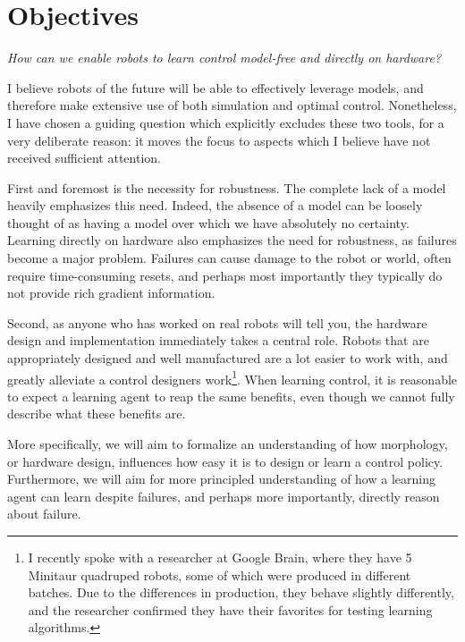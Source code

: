 \section{Objectives}
\emph{How can we enable robots to learn control model-free and directly on hardware?} \par
I believe robots of the future will be able to effectively leverage models, and therefore make extensive use of both simulation and optimal control.
Nonetheless, I have chosen a guiding question which explicitly excludes these two tools, for a very deliberate reason: it moves the focus to aspects which I believe have not received sufficient attention. \par
First and foremost is the necessity for robustness. The complete lack of a model heavily emphasizes this need. Indeed, the absence of a model can be loosely thought of as having a model over which we have absolutely no certainty.
Learning directly on hardware also emphasizes the need for robustness, as failures become a major problem. Failures can cause damage to the robot or world, often require time-consuming resets, and perhaps most importantly they typically do not provide rich gradient information. \par
Second, as anyone who has worked on real robots will tell you, the hardware design and implementation immediately takes a central role. Robots that are appropriately designed and well manufactured are a lot easier to work with, and greatly alleviate a control designers work\footnote{I recently spoke with a researcher at Google Brain, where they have 5 Minitaur quadruped robots, some of which were produced in different batches. Due to the differences in production, they behave slightly differently, and the researcher confirmed they have their favorites for testing learning algorithms.}. When learning control, it is reasonable to expect a learning agent to reap the same benefits, even though we cannot fully describe what these benefits are. \par

More specifically, we will aim to formalize an understanding of how morphology, or hardware design, influences how easy it is to design or learn a control policy. Furthermore, we will aim for more principled understanding of how a learning agent can learn despite failures, and perhaps more importantly, directly reason about failure.


